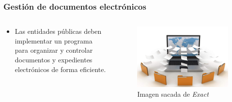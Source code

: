 \begin{frame}[allowframebreaks]

  \frametitle{Gestión de documentos electrónicos}

  \begin{columns}
    \begin{column}{.5\textwidth}
      \begin{itemize}
        \item Las entidades públicas deben implementar un programa para organizar y controlar documentos y expedientes electrónicos de forma eficiente.
      \end{itemize}  
    \end{column}

    \begin{column}{.5\textwidth}
      \begin{figure}[ht]
        \centering
        \includegraphics[width=\textwidth]{img/GestionDocumentos.jpg}
        \caption{Imagen sacada de \textit{Exact}\cite{Exact2022}}
      \end{figure}

    \end{column}
  \end{columns}  


\end{frame}

